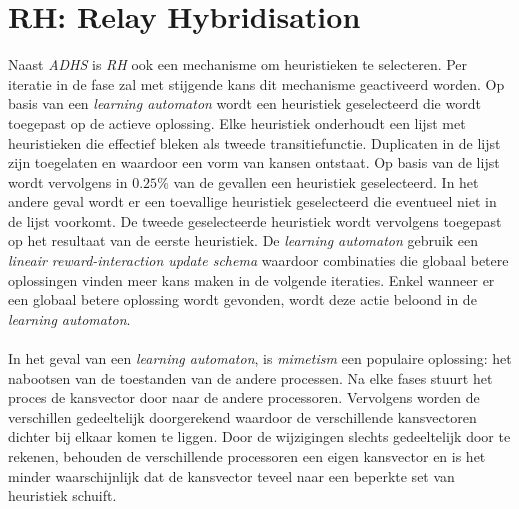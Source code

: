 \section{RH: Relay Hybridisation}

Naast \emph{ADHS} is \emph{RH} ook een mechanisme om heuristieken te selecteren. Per iteratie in de fase zal met stijgende kans dit mechanisme geactiveerd worden. Op basis van een \emph{learning automaton}\cite{RePEc:cla:levarc:481} wordt een heuristiek geselecteerd die wordt toegepast op de actieve oplossing. Elke heuristiek onderhoudt een lijst met heuristieken die effectief bleken als tweede transitiefunctie. Duplicaten in de lijst zijn toegelaten en waardoor een vorm van kansen ontstaat. Op basis van de lijst wordt vervolgens in $0.25\%$ van de gevallen een heuristiek geselecteerd. In het andere geval wordt er een toevallige heuristiek geselecteerd die eventueel niet in de lijst voorkomt. De tweede geselecteerde heuristiek wordt vervolgens toegepast op het resultaat van de eerste heuristiek. De \emph{learning automaton} gebruik een \emph{lineair reward-interaction update schema} waardoor combinaties die globaal betere oplossingen vinden meer kans maken in de volgende iteraties. Enkel wanneer er een globaal betere oplossing wordt gevonden, wordt deze actie beloond in de \emph{learning automaton}.

\paragraph{}
In het geval van een \emph{learning automaton}, is \emph{mimetism} een populaire oplossing: het nabootsen van de toestanden van de andere processen. Na elke fases stuurt het proces de kansvector door naar de andere processoren. Vervolgens worden de verschillen gedeeltelijk doorgerekend waardoor de verschillende kansvectoren dichter bij elkaar komen te liggen. Door de wijzigingen slechts gedeeltelijk door te rekenen, behouden de verschillende processoren een eigen kansvector en is het minder waarschijnlijk dat de kansvector teveel naar een beperkte set van heuristiek schuift.
